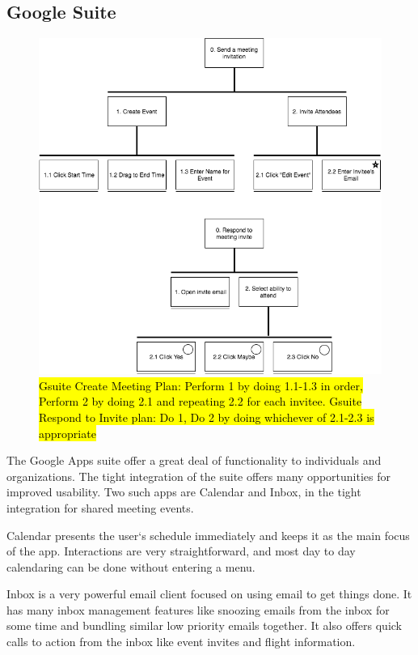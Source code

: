 \documentclass{sigchi}
\begin{document}
\subsection{Google Suite}
\FloatBarrier
\begin{figure}
  \centering
  \includegraphics[width=1.75\columnwidth]{google/GoogleHTA}
  \caption{\hl{Gsuite Create Meeting Plan: Perform 1 by doing 1.1-1.3 in order, Perform 2 by doing 2.1 and repeating 2.2 for each invitee. Gsuite Respond to Invite plan: Do 1, Do 2 by doing whichever of 2.1-2.3 is appropriate}}
\end{figure}

The Google Apps suite offer a great deal of functionality to individuals and organizations.
The tight integration of the suite offers many opportunities for improved usability.
Two such apps are Calendar and Inbox, in the tight integration for shared meeting events. 

Calendar presents the user`s schedule immediately and keeps it as the main focus of the app.
Interactions are very straightforward, and most day to day calendaring can be done without entering a menu.

Inbox is a very powerful email client focused on using email to get things done.
It has many inbox management features like snoozing emails from the inbox for some time and bundling similar low priority emails together.
It also offers quick calls to action from the inbox like event invites and flight information.
\end{document}
